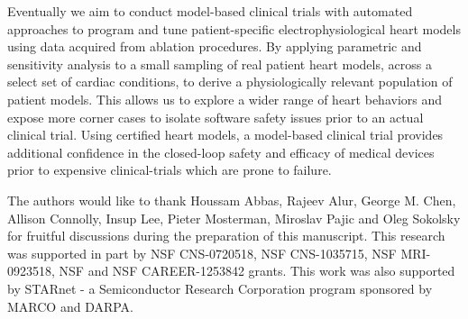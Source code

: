 Eventually we aim to conduct model-based clinical trials with automated approaches to program and tune patient-specific electrophysiological heart models using data acquired from ablation procedures. By applying parametric and sensitivity analysis to a small sampling of real patient heart models, across a select set of cardiac conditions, to derive a physiologically relevant population of patient models. This allows us to explore a wider range of heart behaviors and expose more corner cases to isolate software safety issues prior to an actual clinical trial. Using certified heart models, a model-based clinical trial provides additional confidence in the closed-loop safety and efficacy of medical devices prior to expensive clinical-trials which are prone to failure. 

\begin{acknowledgements}
The authors would like to thank Houssam Abbas, Rajeev Alur, George M. Chen, Allison Connolly, Insup Lee, Pieter Mosterman, Miroslav Pajic and Oleg Sokolsky  for fruitful discussions during the preparation of this manuscript. This research was supported in part by NSF CNS-0720518, NSF CNS-1035715, NSF MRI-0923518, NSF and NSF CAREER-1253842 grants. This work was also supported by STARnet - a Semiconductor Research Corporation program sponsored by MARCO and DARPA.
\end{acknowledgements}
